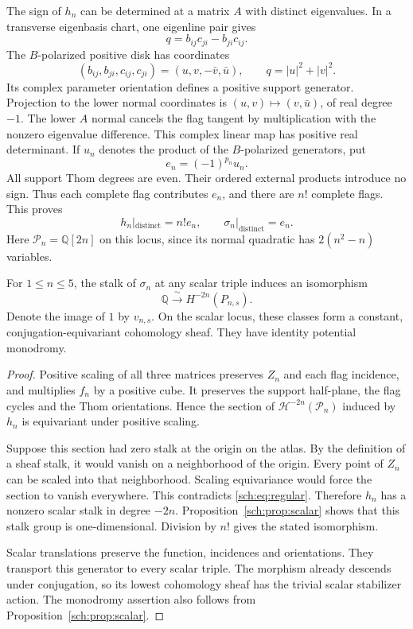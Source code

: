 The sign of $h_n$ can be determined at a matrix $A$ with distinct
eigenvalues. In a transverse eigenbasis chart, one eigenline pair gives
\[
 q=b_{ij}c_{ji}-b_{ji}c_{ij}.
\]
The $B$-polarized positive disk has coordinates
\[
 (b_{ij},b_{ji},c_{ij},c_{ji})=(u,v,-\bar v,\bar u),
 \qquad q=|u|^2+|v|^2.
\]
Its complex parameter orientation defines a positive support generator.
Projection to the lower normal coordinates is
$(u,v)\mapsto(v,\bar u)$, of real degree $-1$.
The lower $A$ normal cancels the flag tangent by multiplication with
the nonzero eigenvalue difference. This complex linear map has
positive real determinant.
If $u_n$ denotes the product of the $B$-polarized generators, put
\[
 e_n=(-1)^{p_n}u_n.
\]
All support Thom degrees are even. Their ordered external products
introduce no sign. Thus each complete flag contributes $e_n$, and
there are $n!$ complete flags. This proves
\begin{equation}
 h_n|_{\mathrm{distinct}}=n!e_n,
 \qquad \sigma_n|_{\mathrm{distinct}}=e_n.
 \label{sch:eq:regular}
\end{equation}
Here $\mathcal P_n=\mathbb Q[2n]$ on this locus, since its normal
quadratic has $2(n^2-n)$ variables.

\begin{theorem}
\label{sch:thm:generator}
For $1\leq n\leq5$, the stalk of $\sigma_n$ at any scalar triple
induces an isomorphism
\[
 \mathbb Q\xrightarrow{\ \sim\ }H^{-2n}(P_{n,s}).
\]
Denote the image of $1$ by $v_{n,s}$. On the scalar locus, these
classes form a constant, conjugation-equivariant cohomology sheaf.
They have identity potential monodromy.
\end{theorem}

\begin{proof}
Positive scaling of all three matrices preserves $Z_n$ and each
flag incidence, and multiplies $f_n$ by a positive cube.
It preserves the support half-plane, the flag cycles and the Thom
orientations. Hence the section of $\mathcal H^{-2n}(\mathcal P_n)$
induced by $h_n$ is equivariant under positive scaling.

Suppose this section had zero stalk at the origin on the atlas.
By the definition of a sheaf stalk, it would vanish on a neighborhood
of the origin. Every point of $Z_n$ can be scaled into that neighborhood.
Scaling equivariance would force the section to vanish everywhere.
This contradicts \eqref{sch:eq:regular}. Therefore $h_n$ has a
nonzero scalar stalk in degree $-2n$.
Proposition~\ref{sch:prop:scalar} shows that this stalk group is
one-dimensional. Division by $n!$ gives the stated isomorphism.

Scalar translations preserve the function, incidences and orientations.
They transport this generator to every scalar triple.
The morphism already descends under conjugation, so its lowest
cohomology sheaf has the trivial scalar stabilizer action.
The monodromy assertion also follows from
Proposition~\ref{sch:prop:scalar}.
\end{proof}

